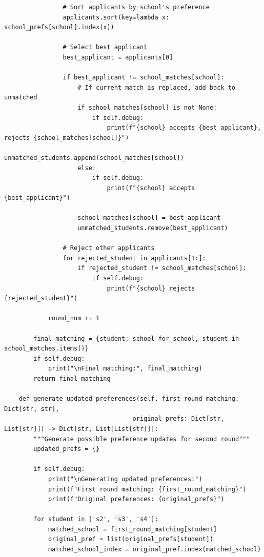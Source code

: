 \documentclass{article}
\begin{document}
\begin{verbatim}
                # Sort applicants by school's preference
                applicants.sort(key=lambda x: school_prefs[school].index(x))
                
                # Select best applicant
                best_applicant = applicants[0]
                
                if best_applicant != school_matches[school]:
                    # If current match is replaced, add back to unmatched
                    if school_matches[school] is not None:
                        if self.debug:
                            print(f"{school} accepts {best_applicant}, rejects {school_matches[school]}")
                        unmatched_students.append(school_matches[school])
                    else:
                        if self.debug:
                            print(f"{school} accepts {best_applicant}")
                            
                    school_matches[school] = best_applicant
                    unmatched_students.remove(best_applicant)
                
                # Reject other applicants
                for rejected_student in applicants[1:]:
                    if rejected_student != school_matches[school]:
                        if self.debug:
                            print(f"{school} rejects {rejected_student}")
                            
            round_num += 1
                    
        final_matching = {student: school for school, student in school_matches.items()}
        if self.debug:
            print("\nFinal matching:", final_matching)
        return final_matching
        
    def generate_updated_preferences(self, first_round_matching: Dict[str, str], 
                                   original_prefs: Dict[str, List[str]]) -> Dict[str, List[List[str]]]:
        """Generate possible preference updates for second round"""
        updated_prefs = {}
        
        if self.debug:
            print("\nGenerating updated preferences:")
            print(f"First round matching: {first_round_matching}")
            print(f"Original preferences: {original_prefs}")
            
        for student in ['s2', 's3', 's4']:
            matched_school = first_round_matching[student]
            original_pref = list(original_prefs[student])
            matched_school_index = original_pref.index(matched_school)
            

\end{verbatim}
\end{document}
